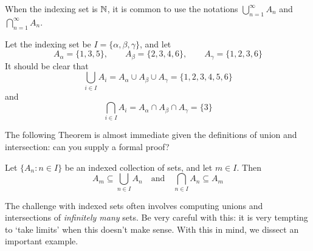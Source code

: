 When the indexing set is $\mathbb{N}$, it is common to use the notations $\bigcup\limits_{n=1}^\infty A_n$ and $\bigcap\limits_{n=1}^\infty A_n$.

\begin{example}{}{}
	Let the indexing set be $I=\{\alpha,\beta,\gamma\}$, and let
	\[
		A_\alpha=\{1,3,5\},\qquad A_\beta=\{2,3,4,6\},\qquad A_\gamma=\{1,2,3,6\}
	\]
	It should be clear that
	\[
		\bigcup_{i\in I}A_i=A_\alpha\cup A_\beta\cup A_\gamma=\{1,2,3,4,5,6\}
	\]
	and
	\[
		\bigcap_{i\in I}A_i=A_\alpha\cap A_\beta\cap A_\gamma=\{3\}
	\]
\end{example}

The following Theorem is almost immediate given the definitions of union and intersection: can you supply a formal proof?

\begin{thm}{}{}
	Let $\{A_n:n\in I\}$ be an indexed collection of sets, and let $m\in I$. Then
	\[
		A_m\subseteq\bigcup_{n\in I}A_n\quad\text{and}\quad \bigcap_{n\in I}A_n\subseteq A_m
	\]
\end{thm}






The challenge with indexed sets often involves computing unions and intersections of \emph{infinitely many} sets. Be very careful with this: it is very tempting to `take limits' when this doesn't make sense. With this in mind, we dissect an important example.\par

